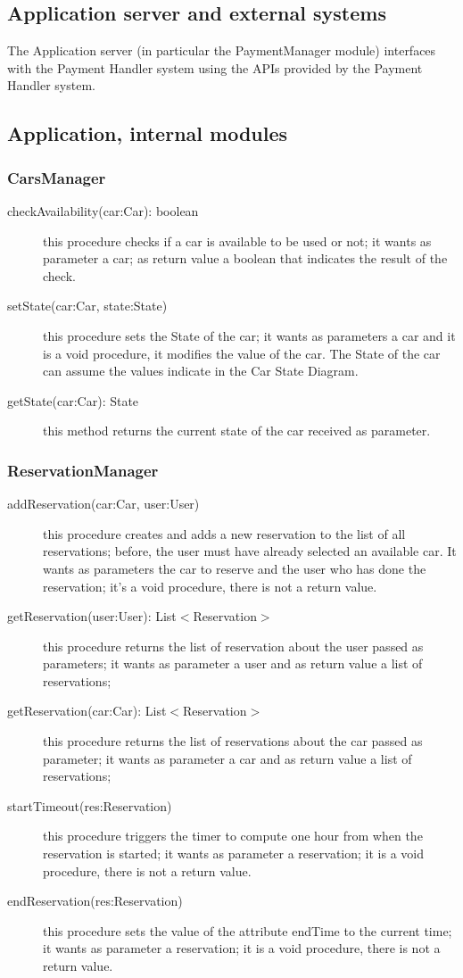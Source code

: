 \documentclass{scrreprt}
\begin{document}
\subsection{Application server and external systems}
The Application server (in particular the PaymentManager module) interfaces with the Payment Handler system using the APIs provided by the Payment Handler system.

\subsection{Application, internal modules}
\subsubsection{CarsManager}
\begin{description}
\item[checkAvailability(car:Car): boolean] this procedure checks if a car is available to be used or not; it wants as parameter a car; as return value a boolean that indicates the result of the check.
\item[setState(car:Car, state:State)] this procedure sets the State of the car; it wants as parameters a car and it is a void procedure, it modifies the value of the car. The State of the car can assume the values indicate in the Car State Diagram.
\item[getState(car:Car): State] this method returns the current state of the car received as parameter.
\end{description}

\subsubsection{ReservationManager}
\begin{description}
\item[addReservation(car:Car, user:User)] this procedure creates and adds a new reservation to the list of all reservations; before, the user must have already selected an available car. It wants as parameters the car to reserve and the user who has done the reservation; it's a void procedure, there is not a return value.
\item[getReservation(user:User): List$<$Reservation$>$] this procedure returns the list of reservation about the user passed as parameters; it wants as parameter a user and as return value a list of reservations;
\item[getReservation(car:Car): List$<$Reservation$>$] this procedure returns the list of reservations about the car passed  as parameter; it wants as parameter a car and as return value a list of reservations;
\item[startTimeout(res:Reservation)] this procedure triggers the timer to compute one hour from when the reservation is started; it wants as parameter a reservation; it is a void procedure, there is not a return value.
\item[endReservation(res:Reservation)] this procedure sets the value of the attribute endTime to the current time; it wants as parameter a reservation; it is a void procedure, there is not a return value.
\end{description}
\end{document}
